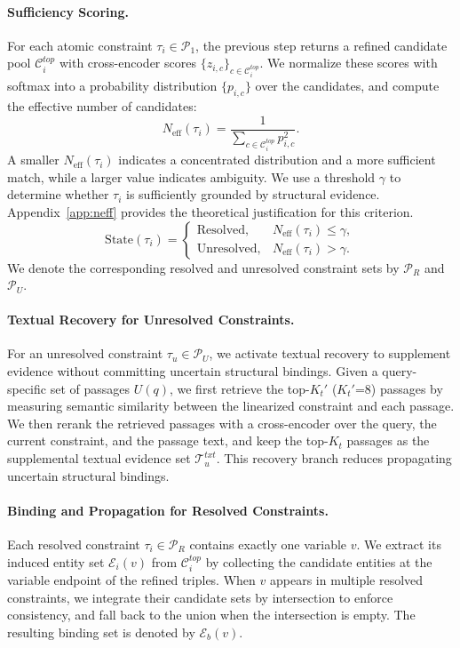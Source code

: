 \documentclass{article}
\theoremstyle{plain}
\theoremstyle{definition}
\theoremstyle{remark}
\begin{document}
\paragraph{Sufficiency Scoring.}
For each atomic constraint $\tau_i\in\mathcal{P}_1$, the previous step returns a refined candidate pool $\mathcal{C}_i^{top}$
with cross-encoder scores $\{z_{i,c}\}_{c\in\mathcal{C}_i^{top}}$.
We normalize these scores with softmax into a probability distribution $\{p_{i,c}\}$ over the candidates, and compute the effective number of candidates:
\begin{equation}
N_{\mathrm{eff}}(\tau_i)=\frac{1}{\sum_{c\in\mathcal{C}_i^{top}}p_{i,c}^2}.
\label{eq:neff}
\end{equation}
A smaller $N_{\mathrm{eff}}(\tau_i)$ indicates a concentrated distribution and a more sufficient match, while a larger value indicates ambiguity.
We use a threshold $\gamma$ to determine whether $\tau_i$ is sufficiently grounded by structural evidence. Appendix~\ref{app:neff} provides the theoretical justification for this criterion.
\begin{equation}
\mathrm{State}(\tau_i) =
\begin{cases}
\mathrm{Resolved},   & N_{\mathrm{eff}}(\tau_i) \le \gamma,\\
\mathrm{Unresolved}, & N_{\mathrm{eff}}(\tau_i) > \gamma.
\end{cases}
\label{eq:state}
\end{equation}
We denote the corresponding resolved and unresolved constraint sets by $\mathcal{P}_R$ and $\mathcal{P}_U$.


\paragraph{Textual Recovery for Unresolved Constraints.}
For an unresolved constraint $\tau_u\in\mathcal{P}_U$, we activate textual recovery to supplement evidence without committing uncertain structural bindings.
Given a query-specific set of passages $U(q)$, we first retrieve the top-$K_t'$ ($K_t'$=8) passages by measuring semantic similarity between the linearized constraint and each passage. 
We then rerank the retrieved passages with a cross-encoder over the query, the current constraint, and the passage text, and keep the top-$K_t$ passages as the supplemental textual evidence set $\mathcal{T}_u^{txt}$.
This recovery branch reduces propagating uncertain structural bindings.


\paragraph{Binding and Propagation for Resolved Constraints.}
Each resolved constraint $\tau_i\in\mathcal{P}_R$ contains exactly one variable $v$.
We extract its induced entity set $\mathcal{E}_i(v)$ from $\mathcal{C}_i^{top}$ by collecting the candidate entities at the variable endpoint of the refined triples.
When $v$ appears in multiple resolved constraints, we integrate their candidate sets by intersection to enforce consistency, and fall back to the union when the intersection is empty.
The resulting binding set is denoted by $\mathcal{E}_b(v)$.
\end{document}
